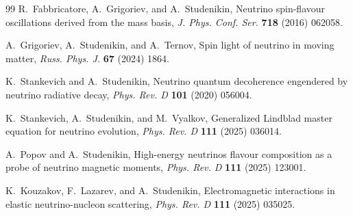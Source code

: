 \documentclass[a4paper,11pt]{article}
\begin{document}
\begin{thebibliography}{99}
R.~Fabbricatore, A.~Grigoriev, and A.~Studenikin,
Neutrino spin-flavour oscillations derived from the mass basis,
{\em J. Phys. Conf. Ser.} {\bf 718} (2016) 062058.

A.~Grigoriev, A.~Studenikin, and A.~Ternov,
Spin light of neutrino in moving matter,
{\em Russ. Phys. J.} {\bf 67} (2024) 1864.

K.~Stankevich and A.~Studenikin,
Neutrino quantum decoherence engendered by neutrino radiative decay,
{\em Phys. Rev. D} {\bf 101} (2020) 056004.

K.~Stankevich, A.~Studenikin, and M.~Vyalkov,
Generalized Lindblad master equation for neutrino evolution,
{\em Phys. Rev. D} {\bf 111} (2025) 036014.

A.~Popov and A.~Studenikin,
High-energy neutrinos flavour composition as a probe of neutrino magnetic moments,
{\em Phys. Rev. D} {\bf 111} (2025) 123001.

K.~Kouzakov, F.~Lazarev, and A.~Studenikin,
Electromagnetic interactions in elastic neutrino-nucleon scattering,
{\em Phys. Rev. D} {\bf 111} (2025) 035025.

\end{thebibliography}
\end{document}
